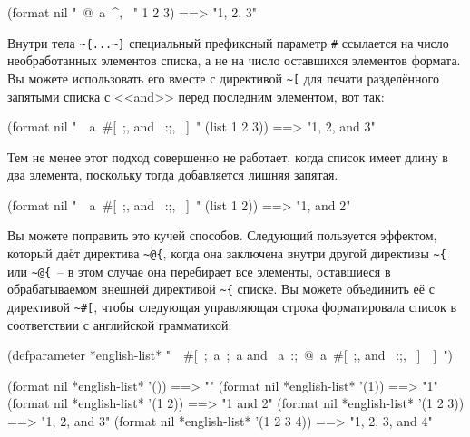 \begin{myverb}
(format nil "~@{~a~^, ~}" 1 2 3) ==> "1, 2, 3"
\end{myverb}

Внутри тела \lstinline!~{...~}! специальный префиксный параметр \lstinline!#! ссылается на число необработанных элементов списка, а
не на число оставшихся элементов формата. Вы можете использовать его вместе с директивой \lstinline!~[! для печати
разделённого запятыми списка с <<and>> перед последним элементом, вот так:

\begin{myverb}
(format nil "~{~a~#[~;, and ~:;, ~]~}" (list 1 2 3)) ==> "1, 2, and 3"
\end{myverb}

Тем не менее этот подход совершенно не работает, когда список имеет длину в два элемента,
поскольку тогда добавляется лишняя запятая.

\begin{myverb}
(format nil "~{~a~#[~;, and ~:;, ~]~}" (list 1 2)) ==> "1, and 2"
\end{myverb}

Вы можете поправить это кучей способов. Следующий пользуется эффектом, который даёт директива \lstinline!~@{!, когда она
заключена внутри другой директивы \lstinline!~{! или \lstinline!~@{!~-- в этом случае она перебирает все элементы, оставшиеся в
обрабатываемом внешней директивой \lstinline!~{! списке. Вы можете объединить её с директивой \lstinline!~#[!, чтобы следующая
управляющая строка форматировала список в соответствии с английской грамматикой:

\begin{myverb}
(defparameter *english-list*
  "~{~#[~;~a~;~a and ~a~:;~@{~a~#[~;, and ~:;, ~]~}~]~}")

(format nil *english-list* '())        ==> ""
(format nil *english-list* '(1))       ==> "1"
(format nil *english-list* '(1 2))     ==> "1 and 2"
(format nil *english-list* '(1 2 3))   ==> "1, 2, and 3"
(format nil *english-list* '(1 2 3 4)) ==> "1, 2, 3, and 4"
\end{myverb}


